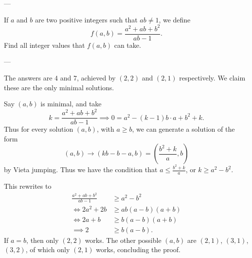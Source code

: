 
---

If $a$ and $b$ are two positive integers such that $ab\ne1$, we define \[f(a,b)=\frac{a^2+ab+b^2}{ab-1}.\]
Find all integer values that $f(a,b)$ can take.

---

The answers are $4$ and $7$, achieved by $(2,2)$ and $(2,1)$ respectively. We claim these are the only minimal solutions.

Say $(a,b)$ is minimal, and take \[k=\frac{a^2+ab+b^2}{ab-1}\implies0=a^2-(k-1)b\cdot a+b^2+k.\]
Thus for every solution $(a,b)$, with $a\ge b$, we can generate a solution of the form \[(a,b)\to(kb-b-a,b)=\left(\frac{b^2+k}a,b\right)\]
by Vieta jumping. Thus we have the condition that $a\le\frac{b^2+k}a$, or $k\ge a^2-b^2$.

This rewrites to
\begin{align*}
    \frac{a^2+ab+b^2}{ab-1}&\ge a^2-b^2\\
    \iff2a^2+2b&\ge ab(a-b)(a+b)\\
    \iff2a+b&\ge b(a-b)(a+b)\\
    \implies2&\ge b(a-b).
\end{align*}
If $a=b$, then only $(2,2)$ works. The other possible $(a,b)$ are $(2,1)$, $(3,1)$, $(3,2)$, of which only $(2,1)$ works, concluding the proof.
